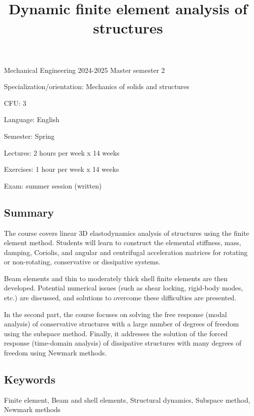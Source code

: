\documentclass[11pt]{amsart}
\title{Dynamic finite element analysis of structures}
\begin{document}
\maketitle

\noindent Mechanical Engineering 2024-2025 Master semester 2

\noindent Specialization/orientation: Mechanics of solids and structures

\noindent CFU: 3

\noindent Language: English
 
\noindent Semester: Spring

\noindent Lectures: 2 hours per week x 14 weeks

\noindent Exercises: 1 hour per week x 14 weeks

\noindent Exam: summer session (written)

\subsection*{Summary}
The course covers linear 3D elastodynamics analysis of structures using the finite element method. Students will learn to construct the elemental stiffness, mass, damping, Coriolis, and angular and centrifugal acceleration matrices for rotating or non-rotating, conservative or dissipative systems. 

Beam elements and thin to moderately thick shell finite elements are then developed. Potential numerical issues (such as shear locking, rigid-body modes, etc.) are discussed, and solutions to overcome these difficulties are presented.

In the second part, the course focuses on solving the free response (modal analysis) of conservative structures with a large number of degrees of freedom using the subspace method. Finally, it addresses the solution of the forced response (time-domain analysis) of dissipative structures with many degrees of freedom using Newmark methods.

\subsection*{Keywords}
Finite element, Beam and shell elements, Structural dynamics, Subspace method, Newmark methods
\end{document}
